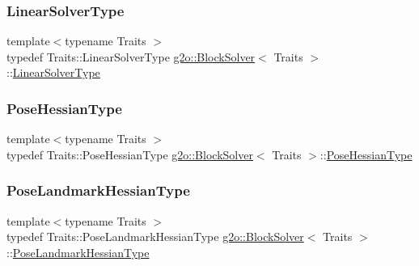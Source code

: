 \mbox{\label{classg2o_1_1_block_solver_a717fa8cb1dd5a212e41d8ebef67955e6}} 
\subsubsection{\texorpdfstring{Linear\+Solver\+Type}{LinearSolverType}}
{\footnotesize\ttfamily template$<$typename Traits $>$ \\
typedef Traits\+::\+Linear\+Solver\+Type \mbox{\hyperlink{classg2o_1_1_block_solver}{g2o\+::\+Block\+Solver}}$<$ Traits $>$\+::\mbox{\hyperlink{classg2o_1_1_block_solver_a717fa8cb1dd5a212e41d8ebef67955e6}{Linear\+Solver\+Type}}}

\mbox{\label{classg2o_1_1_block_solver_a0e7f862860a1e3391cec3cfaf69c48be}} 
\subsubsection{\texorpdfstring{Pose\+Hessian\+Type}{PoseHessianType}}
{\footnotesize\ttfamily template$<$typename Traits $>$ \\
typedef Traits\+::\+Pose\+Hessian\+Type \mbox{\hyperlink{classg2o_1_1_block_solver}{g2o\+::\+Block\+Solver}}$<$ Traits $>$\+::\mbox{\hyperlink{classg2o_1_1_block_solver_a0e7f862860a1e3391cec3cfaf69c48be}{Pose\+Hessian\+Type}}}

\mbox{\label{classg2o_1_1_block_solver_aed8b44e394d2f19ca03c87adf90cc97c}} 
\subsubsection{\texorpdfstring{Pose\+Landmark\+Hessian\+Type}{PoseLandmarkHessianType}}
{\footnotesize\ttfamily template$<$typename Traits $>$ \\
typedef Traits\+::\+Pose\+Landmark\+Hessian\+Type \mbox{\hyperlink{classg2o_1_1_block_solver}{g2o\+::\+Block\+Solver}}$<$ Traits $>$\+::\mbox{\hyperlink{classg2o_1_1_block_solver_aed8b44e394d2f19ca03c87adf90cc97c}{Pose\+Landmark\+Hessian\+Type}}}

